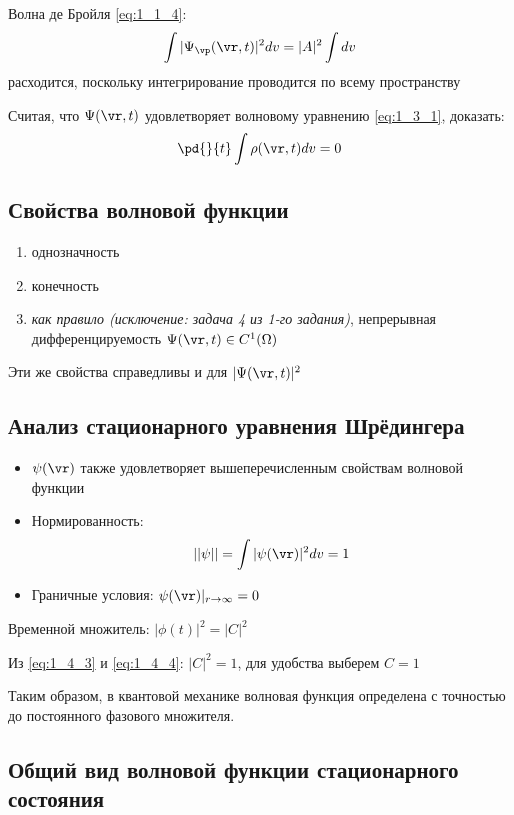 \begin{exmpl}
Волна де Бройля \eqref{eq:1_1_4}:
$$\int |\Psi_{\vp}(\vr,t)|^2 dv = |A|^2 \int dv$$
расходится, поскольку интегрирование проводится по всему пространству
\end{exmpl}


\begin{excr}
Считая, что $\Psi(\vr,t)$ удовлетворяет волновому уравнению \eqref{eq:1_3_1}, доказать:
$$\pd{}{t} \int \rho(\vr,t) dv = 0$$
\end{excr}

\subsection*{Свойства волновой функции}

\begin{enumerate}
\item однозначность
\item конечность
\item \textit{как правило (исключение: задача 4 из 1-го задания)}, непрерывная дифференцируемость $\Psi(\vr,t) \in C^1(\Omega)$
\end{enumerate}

Эти же свойства справедливы и для $|\Psi(\vr,t)|^2$

\subsection*{Анализ стационарного уравнения Шрёдингера}

\begin{itemize}
\item $\psi(\vr)$ также удовлетворяет вышеперечисленным свойствам волновой функции
\item Нормированность: 
\begin{equation}
\label{eq:1_4_4}
||\psi|| = \int |\psi(\vr)|^2 dv = 1
\end{equation}
\item Граничные условия: $\psi(\vr)|_{r \to \infty} = 0$
\end{itemize}

Временной множитель: $|\phi (t)|^2= |C|^2$ 

Из \eqref{eq:1_4_3} и \eqref{eq:1_4_4}: $|C|^2 = 1$, для удобства выберем $C = 1$

Таким образом, в квантовой механике волновая функция определена с точностью до постоянного фазового множителя.

\subsection*{Общий вид волновой функции стационарного состояния}


